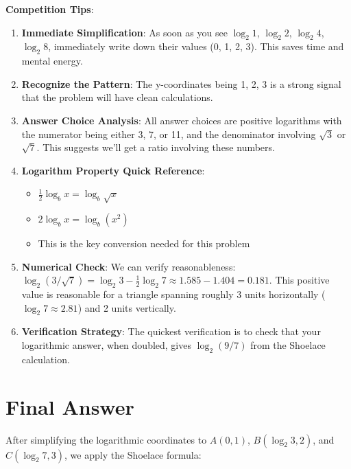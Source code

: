 \documentclass[12pt]{article}
\begin{document}
\begin{tipbox}
\textbf{Competition Tips}:

\begin{enumerate}
    \item \textbf{Immediate Simplification}: As soon as you see $\log_2 1$, $\log_2 2$, $\log_2 4$, $\log_2 8$, immediately write down their values (0, 1, 2, 3). This saves time and mental energy.
    
    \item \textbf{Recognize the Pattern}: The y-coordinates being 1, 2, 3 is a strong signal that the problem will have clean calculations.
    
    \item \textbf{Answer Choice Analysis}: All answer choices are positive logarithms with the numerator being either 3, 7, or 11, and the denominator involving $\sqrt{3}$ or $\sqrt{7}$. This suggests we'll get a ratio involving these numbers.
    
    \item \textbf{Logarithm Property Quick Reference}:
    \begin{itemize}
        \item $\frac{1}{2}\log_b x = \log_b\sqrt{x}$
        \item $2\log_b x = \log_b(x^2)$
        \item This is the key conversion needed for this problem
    \end{itemize}
    
    \item \textbf{Numerical Check}: We can verify reasonableness: $\log_2(3/\sqrt{7}) = \log_2 3 - \frac{1}{2}\log_2 7 \approx 1.585 - 1.404 = 0.181$. This positive value is reasonable for a triangle spanning roughly 3 units horizontally ($\log_2 7 \approx 2.81$) and 2 units vertically.
    
    \item \textbf{Verification Strategy}: The quickest verification is to check that your logarithmic answer, when doubled, gives $\log_2(9/7)$ from the Shoelace calculation.
\end{enumerate}
\end{tipbox}

\section*{Final Answer}

After simplifying the logarithmic coordinates to $A(0,1)$, $B(\log_2 3, 2)$, and $C(\log_2 7, 3)$, we apply the Shoelace formula:
\end{document}
